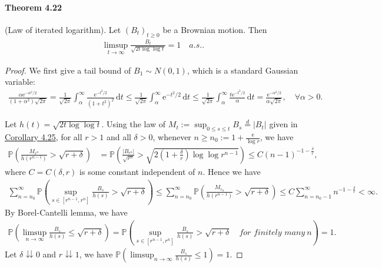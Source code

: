 \documentclass{article}
\numberwithin{equation}{section}
\newcommand{\e}{\mathrm{e}}
\renewcommand{\P}{\mathbb{P}}
\renewcommand{\d}{\mathrm{d}}
\theoremstyle{plain}
\theoremstyle{definition}
\begin{document}
\paragraph{Theorem 4.22\label{thm:4.22}} (Law of iterated logarithm). Let $(B_t)_{t\geq 0}$ be a Brownian motion. Then
\begin{align*}
	\limsup_{t\to\infty}\frac{B_t}{\sqrt{2t\log\log t}} = 1\quad a.s..
\end{align*}
\begin{proof}
We first give a tail bound of $B_1\sim N(0,1)$, which is a standard Gaussian variable:
\begin{align*}
	\frac{\alpha\e^{-\alpha^2/2}}{(1+\alpha^2)\sqrt{2\pi}}=\frac{1}{\sqrt{2\pi}}\int_\alpha^\infty \frac{\e^{-t^2/2}}{(1+t^2)^2}\,\d t\leq\frac{1}{\sqrt{2\pi}}\int_\alpha^\infty \e^{-t^2/2}\,\d t\leq \frac{1}{\sqrt{2\pi}}\int_\alpha^\infty\frac{t\e^{-t^2/2}}{\alpha}\,\d t=\frac{\e^{-\alpha^2/2}}{\alpha\sqrt{2\pi}},\quad \forall\alpha>0.
\end{align*}

Let $h(t)=\sqrt{2t\log\log t}$. Using the law of $M_t:=\sup_{0\leq s\leq t} B_s\overset{d}{=}\vert B_t\vert$ given in \hyperref[cor:4.25]{Corollary 4.25}, for all $r>1$ and all $\delta>0$, whenever $n\geq n_0:=1+\frac{\e}{\log r}$, we have
\begin{align*}
	\P\left(\frac{M_{r^n}}{h(r^{n-1})}>\sqrt{r+\delta}\right)&=\P\left(\frac{\vert B_{r^n}\vert}{\sqrt{r^n}}>\sqrt{2\left(1+\frac{\delta}{r}\right)\log\log r^{n-1}}\right)\leq C(n-1)^{-1-\frac{\delta}{r}},
\end{align*}
where $C=C(\delta,r)$ is some constant independent of $n$. Hence we have
\begin{align*}
	\sum_{n=n_0}^\infty \P\left(\sup_{s\in[r^{n-1},r^n]}\frac{B_s}{h(s)}>\sqrt{r+\delta}\right)\leq\sum_{n=n_0}^\infty \P\left(\frac{M_{r_n}}{h(r^{n-1})}>\sqrt{r+\delta}\right)\leq C\sum_{n= n_0-1}^\infty n^{-1-\frac{\delta}{r}} < \infty.
\end{align*}
By Borel-Cantelli lemma, we have
\begin{align*}
	\P\left(\limsup_{n\to\infty}\frac{B_s}{h(s)}\leq \sqrt{r+\delta}\right)=\P\left(\sup_{s\in[r^{n-1},r^n]}\frac{B_s}{h(s)}>\sqrt{r+\delta}\quad \textit{for finitely many}\ n\right)=1.
\end{align*}
Let $\delta\downdownarrows 0$ and $r\downdownarrows 1$, we have $\P\left(\limsup_{n\to\infty}\frac{B_s}{h(s)}\leq 1\right)=1$.\vspace{0.1cm}


\end{proof}
\end{document}
